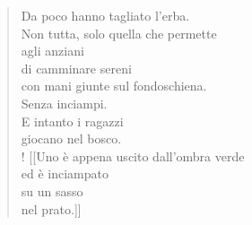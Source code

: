 
\begin{verse}
    Da poco hanno tagliato l'erba.\\
    Non tutta, solo quella che permette\\
    agli anziani\\
    di camminare sereni\\
    con mani giunte sul fondoschiena.\\
    Senza inciampi.\\
    E intanto i ragazzi\\
    giocano nel bosco.\\!
    [[Uno è appena uscito dall'ombra verde\\
    ed è inciampato\\
    su un sasso\\
    nel prato.]]
\end{verse}